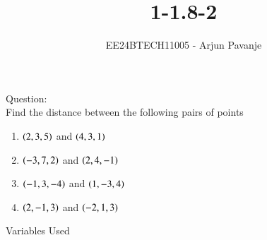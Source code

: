 \documentclass[journal]{IEEEtran}
\begin{document}

\vspace{3cm}

\title{1-1.8-2}
\author{EE24BTECH11005 - Arjun Pavanje
}
{\let\newpage\relax\maketitle}
Question:\\
Find the distance between the following pairs of points\\
\begin{enumerate}
	\item $\left(2,3,5\right)$ and $\left(4,3,1\right)$
	\item $\left(-3,7,2\right)$ and $\left(2,4,-1\right)$
	\item $\left(-1,3,-4\right)$ and $\left(1,-3,4\right)$
	\item $\left(2,-1,3\right)$ and $\left(-2,1,3\right)$
\end{enumerate}
\solution
\begin{table}[h!]    
  \centering
  
  \caption{Variables Used}
  \label{tab1-1.5-29}
\end{table}\\
\end{document}
